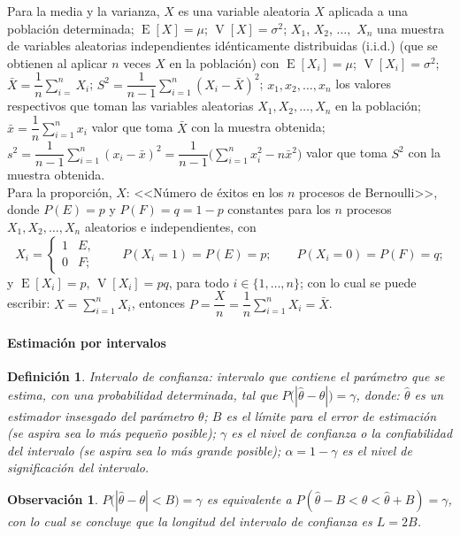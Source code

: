 \documentclass[a5paper,doc,10pt,noapacite]{apa6}
\newcommand{\dsum}{\displaystyle \sum}
\DeclareMathOperator{\Esp}{E}
\DeclareMathOperator{\Var}{V}
\newtheorem{definicion}{Definición}
\newtheorem{observ}{Observación}
\begin{document}
{{Para la media y la varianza, \(X\) es una variable aleatoria \(X\) aplicada a una población determinada; \(\Esp[X]=\mu\); \(\Var[X]=\sigma^2\); \(X_1\), \(X_2\), \(\ldots,\) \(X_n\) una muestra de variables aleatorias independientes idénticamente distribuidas (i.i.d.) (que se obtienen al aplicar \(n\) veces \(X\) en la población) con \(\Esp[X_i]=\mu\); \(\Var[X_i]=\sigma^2\); \(\bar{X}=\dfrac{1}{n}\dsum_{i=}^{n}X_i\); \(S^2=\dfrac{1}{n-1}\dsum_{i=1}^{n}(X_i-\bar{X})^2\); \(x_1,x_2,\ldots,x_n\) los valores respectivos que toman las variables aleatorias \(X_1,X_2,\ldots,X_n\) en la población; \(\bar{x}=\dfrac{1}{n}\dsum_{i=1}^{n}x_i\) valor que toma \(\bar{X}\) con la muestra obtenida; \(s^2=\dfrac{1}{n-1}\dsum_{i=1}^{n}(x_i-\bar{x})^2=\dfrac{1}{n-1} \Big(\sum_{i=1}^{n}x_i^2-n\bar{x}^2 \Big)\) valor que toma \(S^2\) con la muestra obtenida.	\\
	
Para la proporción, \(X\): <<Número de  éxitos en los \(n\) procesos de Bernoulli>>, donde \(P(E)=p\) y \(P(F)=q=1-p\) constantes para los \(n\) procesos \(X_1,X_2,\ldots,X_n\) aleatorios e independientes, con 
\[
	X_i=\begin{cases} 1 & E,\\ 0 & F;\end{cases}
	\qquad
	P(X_i=1)=P(E)=p;
	\qquad
	P(X_i=0)=P(F)=q;
\]
y \(\Esp[X_i]=p\), \(\Var[X_i]=pq\), para todo \(i \in \{1,\ldots,n\}\); con lo cual se puede escribir: \( X=\displaystyle\sum_{i=1}^{n}X_i\), entonces \(P=\dfrac{X}{n}=\dfrac{1}{n}\dsum_{i=1}^{n}X_i=\bar{X}\).

	
	

%
\paragraph{Estimación por intervalos}
	
\begin{definicion}\label{def-4.4}
	Intervalo de confianza: intervalo que contiene el parámetro que se estima, con una probabilidad determinada, tal que \(P\big( |\hat{\theta}-\theta| \big)=\gamma\), donde: \(\hat\theta\) es un estimador insesgado del parámetro \(\theta\); \(B\) es el límite para el error de estimación (se aspira sea lo más pequeño posible); \(\gamma\) es el nivel de confianza o la confiabilidad del intervalo (se aspira sea lo más grande posible); \(\alpha=1-\gamma\) es el nivel de significación del intervalo.
\end{definicion}
	
\begin{observ}
	\(P\big(\left|\hat\theta-\theta\right|<B\big)=\gamma\) es equivalente a \(P(\hat\theta-B<\theta<\hat\theta+B)=\gamma\), con lo cual se concluye que la longitud del intervalo de confianza es \(L=2B\).
\end{observ}
	
}}
\end{document}
